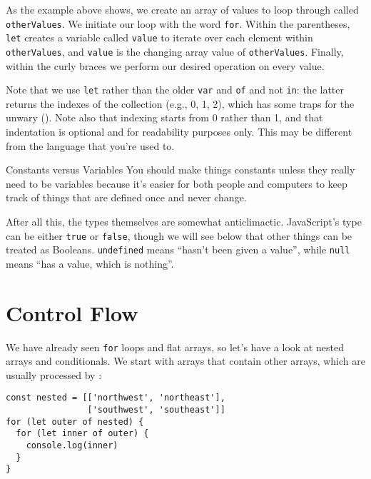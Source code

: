 \noindent
As the example above shows, we create an array of values to loop through called \texttt{otherValues}.
We initiate our loop with the word \texttt{for}.
Within the parentheses,
\texttt{let} creates a variable
called \texttt{value} to iterate over each element within \texttt{otherValues},
and \texttt{value} is the changing array value of \texttt{otherValues}.
Finally, within the curly braces we perform our desired operation on every value.

Note that we use \texttt{let} rather than the older \texttt{var}
and \texttt{of} and not \texttt{in}:
the latter returns the indexes of the collection (e.g., 0, 1, 2),
which has some traps for the unwary ().
Note also that indexing starts from 0 rather than 1,
and that indentation is optional and for readability purposes only.
This may be different from the language that you're used to.

\begin{aside}{Constants versus Variables}
  You should make things constants unless they really need to be variables
  because it's easier for both people and computers to keep track of things
  that are defined once and never change.
\end{aside}

After all this,
the types themselves are somewhat anticlimactic.
JavaScript's  type
can be either \texttt{true} or \texttt{false},
though we will see below that other things can be treated as Booleans.
\texttt{undefined} means ``hasn't been given a value'',
while \texttt{null} means ``has a value, which is nothing''.

\section{Control Flow}\label{s:basics-control-flow}

We have already seen \texttt{for} loops and flat arrays,
so let's have a look at nested arrays and conditionals.
We start with arrays that contain other arrays,
which are usually processed by :

\begin{verbatim}
const nested = [['northwest', 'northeast'],
                ['southwest', 'southeast']]
for (let outer of nested) {
  for (let inner of outer) {
    console.log(inner)
  }
}
\end{verbatim}

